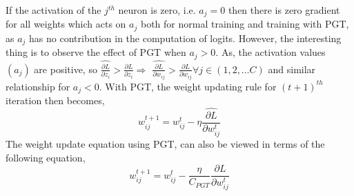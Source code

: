\documentclass[runningheads]{llncs}
\begin{document}
If the activation of the $j^{th}$ neuron is zero, i.e. $a_j = 0$ then there is zero
gradient for all weights which acts on $a_j$ both for normal training and training with
PGT, as $a_j$ has no contribution in the computation of logits. However, the interesting
thing is to observe the effect of PGT when $a_j > 0$. As, the activation values $(a_j)$
are positive, so $ \widehat{\frac{\partial L}{\partial z_i}}  > \frac{\partial
L}{\partial z_{i}} \Rightarrow$ $\widehat{\frac{\partial L}{\partial w_{ij}}} >
\frac{\partial L}{\partial w_{ij}} \forall j \in (1,2,\ldots C)$ and similar
relationship for $a_j < 0$. With PGT, the weight updating rule for $(t+1)^{th}$
iteration then becomes,
\begin{equation}
\label{weight_update_PGT}
w_{ij}^{t+1} = w_{ij}^{t} - \eta \widehat{\frac{\partial L}{\partial w_{ij}^{t}}}
\end{equation}
The weight update equation using PGT, can also be viewed in terms of the following
equation,
\begin{equation}
\label{weight_update_final_PGT}
w_{ij}^{t+1} = w_{ij}^{t} - \frac{\eta}{C_{PGT}} \frac{\partial L}{\partial w_{ij}^{t}}
\end{equation}
\end{document}
